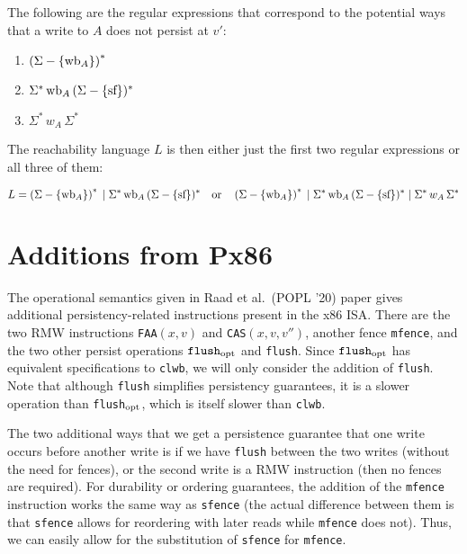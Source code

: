 \documentclass[11pt]{article}
\begin{document}
The following are the regular expressions that correspond to the potential ways that a write to $A$ does not persist at $v'$:
\begin{enumerate}
    \item $\left(\Sigma - \{\textnormal{wb}_A\}\right)^*$
    
    \item $\Sigma^*\, \textnormal{wb}_A\, (\Sigma-\{\textnormal{sf}\})^*$
    
    \item $\Sigma^*\, w_A\, \Sigma^*$ %
\end{enumerate}

The reachability language $L$ is then either just the first two regular expressions or all three of them:

\[L=\left(\Sigma - \{\textnormal{wb}_A\}\right)^* \;\vert\; \Sigma^*\, \textnormal{wb}_A\, (\Sigma-\{\textnormal{sf}\})^* \quad \textnormal{or} \quad \left(\Sigma - \{\textnormal{wb}_A\}\right)^* \;\vert\; \Sigma^*\, \textnormal{wb}_A\, (\Sigma-\{\textnormal{sf}\})^* \;\vert\; \Sigma^*\, w_A\, \Sigma^*\]

\section{Additions from Px86}
The operational semantics given in Raad et al.\ (POPL '20) paper gives additional persistency-related instructions present in the x86 ISA. There are the two RMW instructions \texttt{FAA}$(x,v)$ and \texttt{CAS}$(x,v,v'')$, another fence \texttt{mfence}, and the two other persist operations $\texttt{flush}_{\textnormal{opt}}$ and \texttt{flush}. Since $\texttt{flush}_{\textnormal{opt}}$ has equivalent specifications to \texttt{clwb}, we will only consider the addition of \texttt{flush}. Note that although \texttt{flush} simplifies persistency guarantees, it is a slower operation than \texttt{flush}$_{\textnormal{opt}}$, which is itself slower than \texttt{clwb}.

The two additional ways that we get a persistence guarantee that one write occurs before another write is if we have \texttt{flush} between the two writes (without the need for fences), or the second write is a RMW instruction (then no fences are required). For durability or ordering guarantees, the addition of the \texttt{mfence} instruction works the same way as \texttt{sfence} (the actual difference between them is that \texttt{sfence} allows for reordering with later reads while \texttt{mfence} does not). Thus, we can easily allow for the substitution of \texttt{sfence} for \texttt{mfence}.
\end{document}
